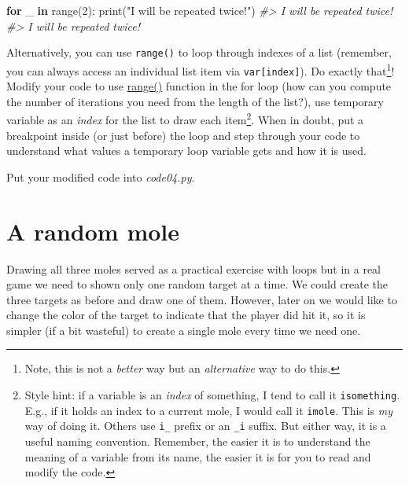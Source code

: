 \documentclass[
]{book}
\newenvironment{Shaded}{\begin{snugshade}}{\end{snugshade}}
\newcommand{\BuiltInTok}[1]{#1}
\newcommand{\CommentTok}[1]{\textcolor[rgb]{0.56,0.35,0.01}{\textit{#1}}}
\newcommand{\ControlFlowTok}[1]{\textcolor[rgb]{0.13,0.29,0.53}{\textbf{#1}}}
\newcommand{\DecValTok}[1]{\textcolor[rgb]{0.00,0.00,0.81}{#1}}
\newcommand{\KeywordTok}[1]{\textcolor[rgb]{0.13,0.29,0.53}{\textbf{#1}}}
\newcommand{\NormalTok}[1]{#1}
\newcommand{\StringTok}[1]{\textcolor[rgb]{0.31,0.60,0.02}{#1}}
\begin{document}
\begin{Shaded}
\begin{Highlighting}[]
\ControlFlowTok{for}\NormalTok{ \_ }\KeywordTok{in} \BuiltInTok{range}\NormalTok{(}\DecValTok{2}\NormalTok{):}
    \BuiltInTok{print}\NormalTok{(}\StringTok{"I will be repeated twice!"}\NormalTok{)}
\CommentTok{\#\textgreater{} I will be repeated twice!}
\CommentTok{\#\textgreater{} I will be repeated twice!}
\end{Highlighting}
\end{Shaded}

Alternatively, you can use \texttt{range()} to loop through indexes of a list (remember, you can always access an individual list item via \texttt{var{[}index{]}}). Do exactly that\footnote{Note, this is not a \emph{better} way but an \emph{alternative} way to do this.}! Modify your code to use \href{(https://docs.python.org/3/library/stdtypes.html\#range)}{range()} function in the for loop (how can you compute the number of iterations you need from the length of the list?), use temporary variable as an \emph{index} for the list to draw each item\footnote{Style hint: if a variable is an \emph{index} of something, I tend to call it \texttt{isomething}. E.g., if it holds an index to a current mole, I would call it \texttt{imole}. This is \emph{my} way of doing it. Others use \texttt{i\_} prefix or an \texttt{\_i} suffix. But either way, it is a useful naming convention. Remember, the easier it is to understand the meaning of a variable from its name, the easier it is for you to read and modify the code.}. When in doubt, put a breakpoint inside (or just before) the loop and step through your code to understand what values a temporary loop variable gets and how it is used.

Put your modified code into \emph{code04.py}.

\hypertarget{random-mole}{%
\section{A random mole}\label{random-mole}}

Drawing all three moles served as a practical exercise with loops but in a real game we need to shown only one random target at a time. We could create the three targets as before and draw one of them. However, later on we would like to change the color of the target to indicate that the player did hit it, so it is simpler (if a bit wasteful) to create a single mole every time we need one.
\end{document}
